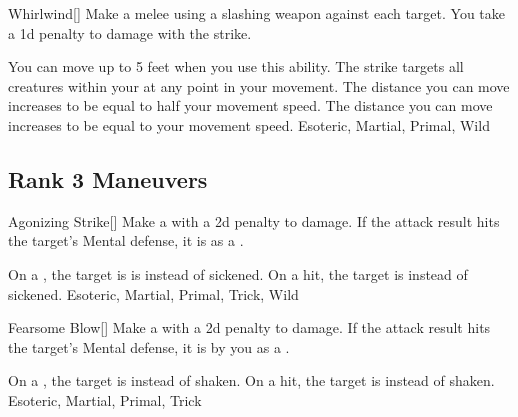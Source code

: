 \lowercase{\hypertarget{maneuver:Whirlwind}{}}\label{maneuver:Whirlwind}
\hypertarget{maneuver:Whirlwind}{}
\begin{freeability}[Rank 1]{Whirlwind}[]
Make a melee  using a slashing weapon against each target.
You take a \minus1d penalty to damage with the strike.

\rankline
{} You can move up to 5 feet when you use this ability.
The strike targets all creatures within your  at any point in your movement.
 The distance you can move increases to be equal to half your movement speed.
 The distance you can move increases to be equal to your movement speed.
 Esoteric, Martial, Primal, Wild
\end{freeability}
\vspace{0.25em}


\subsection{Rank 3 Maneuvers}

\lowercase{\hypertarget{maneuver:Agonizing Strike}{}}\label{maneuver:Agonizing Strike}
\hypertarget{maneuver:Agonizing Strike}{}
\begin{freeability}[Rank 3]{Agonizing Strike}[]
Make a  with a \minus2d penalty to damage.
If the attack result hits the target's Mental defense,
it is  as a .

\rankline
{} On a , the target is is  instead of sickened.
 On a hit, the target is  instead of sickened.
 Esoteric, Martial, Primal, Trick, Wild
\end{freeability}
\vspace{0.25em}



\lowercase{\hypertarget{maneuver:Fearsome Blow}{}}\label{maneuver:Fearsome Blow}
\hypertarget{maneuver:Fearsome Blow}{}
\begin{freeability}[Rank 3]{Fearsome Blow}[]
Make a  with a \minus2d penalty to damage.
If the attack result hits the target's Mental defense,
it is  by you as a .

\rankline
{} On a , the target is  instead of shaken.
 On a hit, the target is  instead of shaken.
 Esoteric, Martial, Primal, Trick
\end{freeability}
\vspace{0.25em}




